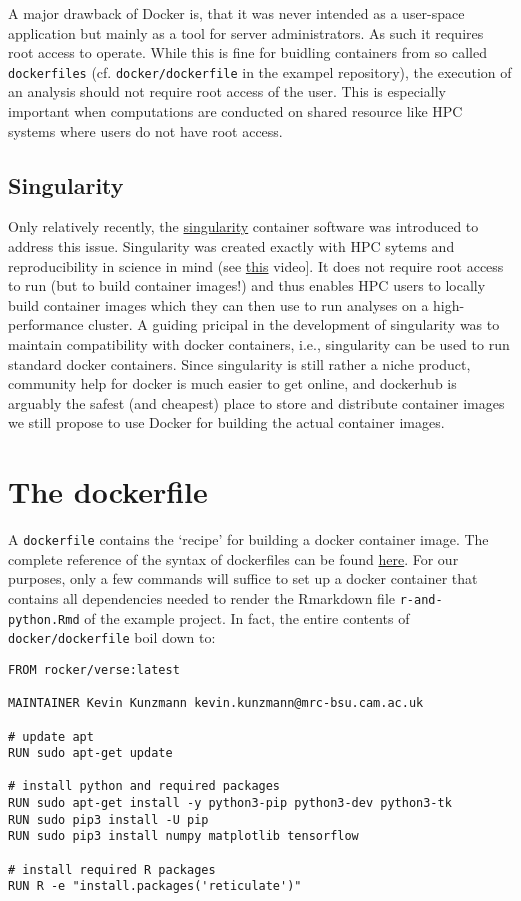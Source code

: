 \documentclass[]{book}
\begin{document}
A major drawback of Docker is, that it was never intended as a
user-space application but mainly as a tool for server administrators.
As such it requires root access to operate. While this is fine for
buidling containers from so called \texttt{dockerfiles} (cf.
\texttt{docker/dockerfile} in the exampel repository), the execution of
an analysis should not require root access of the user. This is
especially important when computations are conducted on shared resource
like HPC systems where users do not have root access.

\subsection{Singularity}\label{singularity}

Only relatively recently, the \href{https://www.sylabs.io/}{singularity}
container software was introduced to address this issue. Singularity was
created exactly with HPC sytems and reproducibility in science in mind
(see \href{https://www.youtube.com/watch?v=DA87Ba2dpNM}{this} video{]}.
It does not require root access to run (but to build container images!)
and thus enables HPC users to locally build container images which they
can then use to run analyses on a high-performance cluster. A guiding
pricipal in the development of singularity was to maintain compatibility
with docker containers, i.e., singularity can be used to run standard
docker containers. Since singularity is still rather a niche product,
community help for docker is much easier to get online, and dockerhub is
arguably the safest (and cheapest) place to store and distribute
container images we still propose to use Docker for building the actual
container images.

\section{The dockerfile}\label{the-dockerfile}

A \texttt{dockerfile} contains the `recipe' for building a docker
container image. The complete reference of the syntax of dockerfiles can
be found \href{https://docs.docker.com/engine/reference/builder/}{here}.
For our purposes, only a few commands will suffice to set up a docker
container that contains all dependencies needed to render the Rmarkdown
file \texttt{r-and-python.Rmd} of the example project. In fact, the
entire contents of \texttt{docker/dockerfile} boil down to:

\begin{verbatim}
FROM rocker/verse:latest

MAINTAINER Kevin Kunzmann kevin.kunzmann@mrc-bsu.cam.ac.uk

# update apt
RUN sudo apt-get update

# install python and required packages
RUN sudo apt-get install -y python3-pip python3-dev python3-tk
RUN sudo pip3 install -U pip
RUN sudo pip3 install numpy matplotlib tensorflow

# install required R packages
RUN R -e "install.packages('reticulate')"
\end{verbatim}
\end{document}
